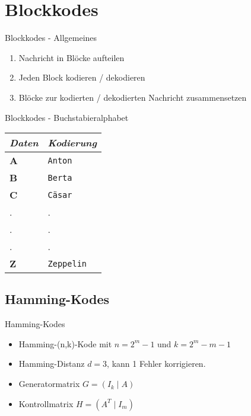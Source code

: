 \documentclass[xcolor=dvipsnames]{beamer}
\newcommand{\semfootnote}[1]{\let\thefootnote\relax\footnotetext{#1}}
\begin{document}
\section{Blockkodes}

\begin{frame}{Blockkodes - Allgemeines}
\begin{enumerate}[<+->]
\item Nachricht in Blöcke aufteilen
\item Jeden Block kodieren / dekodieren
\item Blöcke zur kodierten / dekodierten Nachricht zusammensetzen
\end{enumerate}
\end{frame}

\begin{frame}{Blockkodes - Buchstabieralphabet}
\begin{center}
\begin{tabular}{l l}
\emph{Daten} & \emph{Kodierung} \\
\hline
\textbf{A} & \texttt{Anton} \\
\textbf{B} & \texttt{Berta} \\
\textbf{C} & \texttt{Cäsar} \\
. & .\\
. & .\\
. & .\\
\textbf{Z} & \texttt{Zeppelin} \\
\end{tabular}
\end{center}
\end{frame}

\subsection{Hamming-Kodes}

\begin{frame}{Hamming-Kodes}
\begin{itemize}[<+->]
\item Hamming-(n,k)-Kode mit $n = 2^m-1$ und $k = 2^m-m-1$
\item Hamming-Distanz $d=3$, kann 1 Fehler korrigieren.
\item Generatormatrix $G = \left(I_k \mid A\right)$
\item Kontrollmatrix $H = \left(A^T \mid I_m\right)$
\end{itemize}
\semfootnote{Quelle: [1]}
\end{frame}
\end{document}
